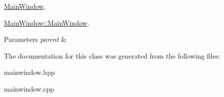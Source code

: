 \hyperlink{classMainWindow}{Main\+Window}. 

\hyperlink{classMainWindow_a8b244be8b7b7db1b08de2a2acb9409db}{Main\+Window\+::\+Main\+Window}.


\begin{DoxyParams}{Parameters}
{\em parent} & \\
\hline
\end{DoxyParams}


The documentation for this class was generated from the following files\+:\begin{DoxyCompactItemize}
\item 
mainwindow.\+hpp\item 
mainwindow.\+cpp\end{DoxyCompactItemize}
